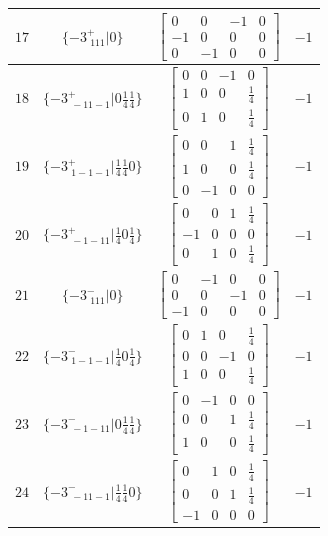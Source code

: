 \documentclass[fleqn,8pt]{jsarticle}
\begin{document}
\begin{longtable}{cccc}
$ 17 $ & $ \{-3^{+}_{\,\,111}|0\} $ & $ \begin{bmatrix} 0 & 0 & -1 & 0 \\ -1 & 0 & 0 & 0 \\ 0 & -1 & 0 & 0 \end{bmatrix} $ & $ -1 $ \\ \hline
$ 18 $ & $ \{-3^{+}_{\,\,-11-1}|0 \frac{1}{4} \frac{1}{4}\} $ & $ \begin{bmatrix} 0 & 0 & -1 & 0 \\ 1 & 0 & 0 & \frac{1}{4} \\ 0 & 1 & 0 & \frac{1}{4} \end{bmatrix} $ & $ -1 $ \\ \hline
$ 19 $ & $ \{-3^{+}_{\,\,1-1-1}|\frac{1}{4} \frac{1}{4} 0\} $ & $ \begin{bmatrix} 0 & 0 & 1 & \frac{1}{4} \\ 1 & 0 & 0 & \frac{1}{4} \\ 0 & -1 & 0 & 0 \end{bmatrix} $ & $ -1 $ \\ \hline
$ 20 $ & $ \{-3^{+}_{\,\,-1-11}|\frac{1}{4} 0 \frac{1}{4}\} $ & $ \begin{bmatrix} 0 & 0 & 1 & \frac{1}{4} \\ -1 & 0 & 0 & 0 \\ 0 & 1 & 0 & \frac{1}{4} \end{bmatrix} $ & $ -1 $ \\ \hline
$ 21 $ & $ \{-3^{-}_{\,\,111}|0\} $ & $ \begin{bmatrix} 0 & -1 & 0 & 0 \\ 0 & 0 & -1 & 0 \\ -1 & 0 & 0 & 0 \end{bmatrix} $ & $ -1 $ \\ \hline
$ 22 $ & $ \{-3^{-}_{\,\,1-1-1}|\frac{1}{4} 0 \frac{1}{4}\} $ & $ \begin{bmatrix} 0 & 1 & 0 & \frac{1}{4} \\ 0 & 0 & -1 & 0 \\ 1 & 0 & 0 & \frac{1}{4} \end{bmatrix} $ & $ -1 $ \\ \hline
$ 23 $ & $ \{-3^{-}_{\,\,-1-11}|0 \frac{1}{4} \frac{1}{4}\} $ & $ \begin{bmatrix} 0 & -1 & 0 & 0 \\ 0 & 0 & 1 & \frac{1}{4} \\ 1 & 0 & 0 & \frac{1}{4} \end{bmatrix} $ & $ -1 $ \\ \hline
$ 24 $ & $ \{-3^{-}_{\,\,-11-1}|\frac{1}{4} \frac{1}{4} 0\} $ & $ \begin{bmatrix} 0 & 1 & 0 & \frac{1}{4} \\ 0 & 0 & 1 & \frac{1}{4} \\ -1 & 0 & 0 & 0 \end{bmatrix} $ & $ -1 $ \\
\end{longtable}
\end{document}
